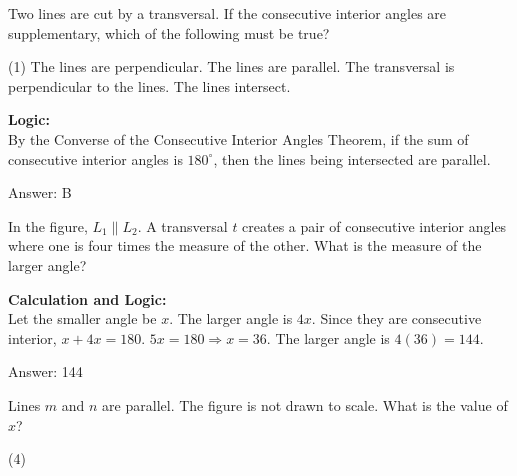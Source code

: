 \documentclass[11pt,paper=a4,answers]{exam}
\begin{document}
\begin{questions}
\vspace{60pt}

\question
Two lines are cut by a transversal. If the consecutive interior angles are supplementary, which of the following must be true?
\begin{tasks}(1)
    \task The lines are perpendicular.
    \task The lines are parallel.
    \task The transversal is perpendicular to the lines.
    \task The lines intersect.
\end{tasks}

\begin{solution}
\textbf{Logic:} \\
By the Converse of the Consecutive Interior Angles Theorem, if the sum of consecutive interior angles is $180^\circ$, then the lines being intersected are parallel.

\vspace{30pt}

Answer: \colorbox{yellow!100}{B}
\end{solution}

\vspace{60pt}

\question
In the figure, $L_1 \parallel L_2$. A transversal $t$ creates a pair of consecutive interior angles where one is four times the measure of the other. What is the measure of the larger angle?

\begin{solution}
\textbf{Calculation and Logic:} \\
Let the smaller angle be $x$. The larger angle is $4x$. Since they are consecutive interior, $x + 4x = 180$. $5x = 180 \Rightarrow x = 36$. The larger angle is $4(36) = 144$.

\vspace{30pt}

Answer: \colorbox{yellow!100}{144}
\end{solution}

\vspace{60pt}

\question
\begin{center}
\end{center}
Lines $m$ and $n$ are parallel. The figure is not drawn to scale. What is the value of $x$?
\begin{tasks}(4)
\end{tasks}


\end{questions}
\end{document}
